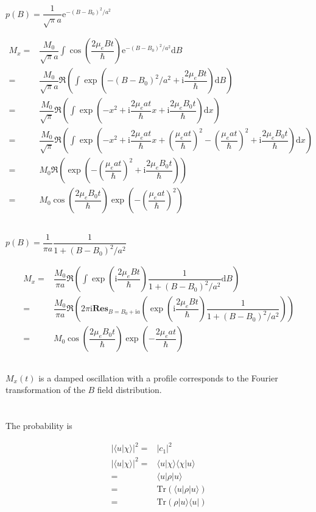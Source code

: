 \documentclass[10pt,fleqn]{article}
\newcommand{\ud}{\mathrm{d}}
\newcommand{\ue}{\mathrm{e}}
\newcommand{\ui}{\mathrm{i}}
\newcommand{\Tr}{\mathrm{Tr}}
\newcommand{\eqar}[1]
{
  \begin{align*}
    #1
  \end{align*}
}
\newcommand{\paren}[1]{{\left({#1}\right)}}
\newcommand{\abs}[1]{{\left|{#1}\right|}}
\begin{document}
\subsection{}
$p(B)=\dfrac{1}{\sqrt{\pi}a}\ue^{-\paren{B-B_0}^2/a^2}$
\eqar{
  M_x=&\dfrac{M_0}{\sqrt{\pi}a}\int\cos\paren{\dfrac{2\mu_eBt}{\hbar}}\ue^{-\paren{B-B_0}^2/a^2}\ud B\\
  =&\dfrac{M_0}{\sqrt{\pi}a}\Re\paren{\int\exp\paren{-\paren{B-B_0}^2/a^2+\ui\dfrac{2\mu_eBt}{\hbar}}\ud B}\\
  =&\dfrac{M_0}{\sqrt{\pi}}\Re\paren{\int\exp\paren{-x^2+\ui\dfrac{2\mu_eat}{\hbar}x+\ui\dfrac{2\mu_eB_0t}{\hbar}}\ud x}\\
  =&\dfrac{M_0}{\sqrt{\pi}}\Re\paren{\int\exp\paren{-x^2+\ui\dfrac{2\mu_eat}{\hbar}x+\paren{\dfrac{\mu_eat}{\hbar}}^2-\paren{\dfrac{\mu_eat}{\hbar}}^2+\ui\dfrac{2\mu_eB_0t}{\hbar}}\ud x}\\
  =&M_0\Re\paren{\exp\paren{-\paren{\dfrac{\mu_eat}{\hbar}}^2+\ui\dfrac{2\mu_eB_0t}{\hbar}}}\\
  =&M_0\cos\paren{\dfrac{2\mu_eB_0t}{\hbar}}\exp\paren{-\paren{\dfrac{\mu_eat}{\hbar}}^2}
}
\subsection{}
$p(B)=\dfrac{1}{\pi a}\dfrac{1}{1+\paren{B-B_0}^2/a^2}$
\eqar{
  M_x=&\dfrac{M_0}{\pi a}\Re\paren{\int\exp\paren{\ui\dfrac{2\mu_eBt}{\hbar}}\dfrac{1}{1+\paren{B-B_0}^2/a^2}\ud B}\\
  =&\dfrac{M_0}{\pi a}\Re\paren{
    2\pi\ui\mathbf{Res}_{B=B_0+\ui a}\paren{\exp\paren{\ui\dfrac{2\mu_eBt}{\hbar}}\dfrac{1}{1+\paren{B-B_0}^2/a^2}}
  }\\
  =&M_0\cos\paren{\dfrac{2\mu_eB_0t}{\hbar}}\exp\paren{-\dfrac{2\mu_eat}{\hbar}}
}
\subsection{}
$M_x\paren{t}$ is a damped oscillation with a profile corresponds to the Fourier transformation of the $B$ field distribution.
\section{}
The probability is
\eqar{
  \abs{\langle u|\chi\rangle}^2=&\abs{c_1}^2\\
  \abs{\langle u|\chi\rangle}^2=&\langle u|\chi\rangle\langle \chi|u\rangle\\
  =&\langle u|\rho|u\rangle\\
  =&\Tr\paren{\langle u|\rho|u\rangle}\\
  =&\Tr\paren{\rho|u\rangle\langle u|}
}
\end{document}
